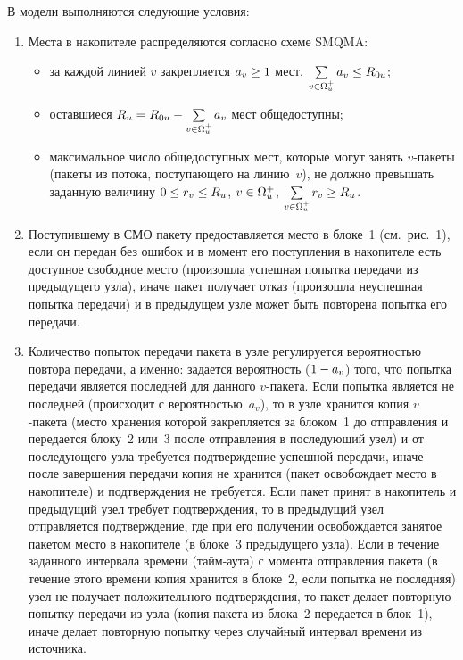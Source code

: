 \begin{multicols}{2}
  В модели выполняются следующие условия:
  \begin{enumerate}[1.]
\item Места в накопителе распределяются согласно схеме SMQMA:
\begin{itemize}
\item за каждой линией $v$ закрепляется $a_v\hm\geq 1$ мест,  
$\sum\limits_{v\in \Omega_u^+} a_v\hm\leq R_{0u}$;
\item оставшиеся $R_u\hm=R_{0u}-\sum\limits_{v\in\Omega_u^+} a_v$ мест 
общедоступны;
\item максимальное число общедоступных мест, которые могут занять 
$v$-пакеты (пакеты из потока, поступающего на линию~$v$), не должно 
превышать заданную величину $0\hm\leq r_v\hm\leq R_u$, $v\hm\in 
\Omega_u^+$, $\sum\limits_{v\in\Omega_u^+}r_v\hm\geq R_u$.
\end{itemize}
\item Поступившему в СМО пакету предоставляется место в блоке~1 (см.\ 
рис.~1), если он передан без ошибок и в момент его поступления в 
накопителе есть доступное свободное место (произошла успешная попытка 
передачи из предыдущего узла), иначе пакет получает отказ (произошла 
неуспешная попытка передачи) и в предыдущем узле может быть повторена 
попытка его передачи.
\item Количество попыток передачи пакета в узле регулируется 
вероятностью повтора передачи, а именно: задается вероятность ($1\hm-a_v$) 
того, что попытка передачи является последней для данного $v$-пакета. 
Если попытка является не последней (происходит с вероятностью~$a_v$), то 
в узле хранится копия $v$-пакета (место хранения которой закрепляется за 
блоком~1 до отправления и передается блоку~2 или~3 после отправления в 
последующий узел) и от последующего узла требуется подтверждение 
успешной передачи, иначе после завершения передачи копия не хранится 
(пакет освобождает место в накопителе) и подтверждения не требуется. Если 
пакет принят в накопитель и предыдущий узел требует подтверждения, то в 
предыдущий узел отправляется подтверждение, где при его получении 
освобождается занятое пакетом место в накопителе (в блоке~3 предыдущего 
узла). Если в течение заданного интервала времени (тайм-аута) с момента 
отправления пакета (в течение этого времени копия хранится в блоке~2, если 
попытка не последняя) узел не получает положительного подтверждения, то 
пакет делает повторную попытку передачи из узла (копия пакета из блока~2 
передается в блок~1), иначе делает повторную попытку через случайный 
интервал времени из источника. 

\end{enumerate}
\end{multicols}
